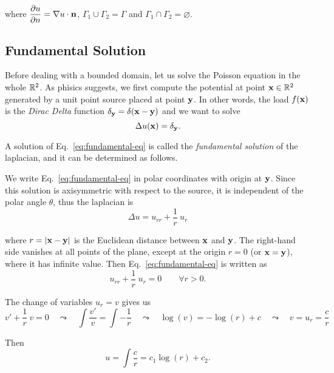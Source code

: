 where $\displaystyle \frac{\partial u}{\partial n}=\nabla u\cdot \mathbf{n} $, $\Gamma_1\cup\Gamma_2=\Gamma$ and $\Gamma_1\cap\Gamma_2=\varnothing$.

\subsection{Fundamental Solution}
\label{sub:fundamental_solution}%

Before dealing with a bounded domain, let us solve the Poisson equation in the whole $\mathbb{R}^2$. As phisics suggests, we first compute the potential at point $\mathbf{x}\in\mathbb{R}^2$ generated by a unit point source placed at point $\mathbf{y}$. In other words, the load $f(\mathbf{x})$ is the \emph{Dirac Delta} function $\delta_{\mathbf{y}}=\delta(\mathbf{x}-\mathbf{y})$ and we want to solve
\begin{equation}
\label{eq:fundamental-eq}
\Delta u(\mathbf{x})=\delta_{\mathbf{y}}.
\end{equation}

A solution of Eq.~\eqref{eq:fundamental-eq} is called the \emph{fundamental solution} of the laplacian, and it can be determined as follows.

We write Eq.~\eqref{eq:fundamental-eq} in polar coordinates with origin at $\mathbf{y}$. Since this solution is axisymmetric with respect to the source, it is independent of the polar angle $\theta$, thus the laplacian is
\begin{equation*}
\Delta u = u_{rr} + \frac{1}{r}\ u_r 
\end{equation*}

where $r=\left| \mathbf{x}-\mathbf{y} \right|$ is the Euclidean distance between $\mathbf{x}$ and $\mathbf{y}$. The right-hand side vanishes at all points of the plane, except at the origin $r=0$ (or $\mathbf{x}=\mathbf{y}$), where it has infinite value. Then Eq.~\eqref{eq:fundamental-eq} is written as
\begin{equation*}
u_{rr} + \frac{1}{r}\ u_r = 0 \qquad \forall r>0.
\end{equation*}

The change of variables $u_r=v$ gives us 
\begin{equation*}
v' + \frac{1}{r}\ v = 0 \quad \leadsto \quad \int \frac{v'}{v}= \int -\frac{1}{r}  \quad \leadsto \quad \log(v) =-\log(r)+c \quad \leadsto \quad v=u_r=\frac{c}{r}
\end{equation*}

Then 
\begin{equation*}
u=\int \frac{c}{r} = c_1\log(r)+c_2.
\end{equation*}

